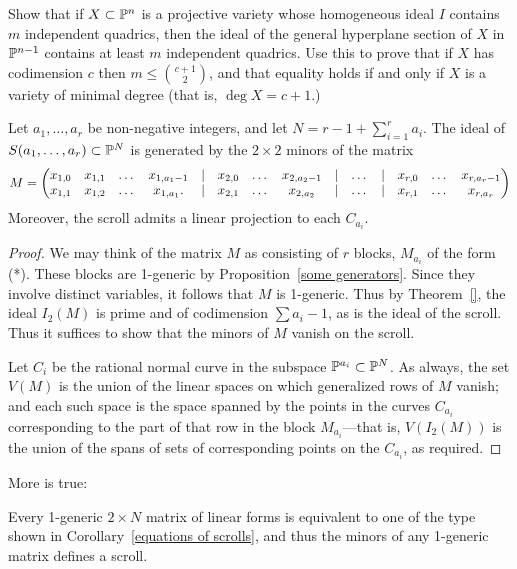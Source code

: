 \begin{exercise}
Show that if $X\subset {\mathbb P}^n$ is a projective variety whose homogeneous ideal $I$ contains $m$ independent quadrics, then the ideal of the general hyperplane section of $X$ in ${\mathbb P}^{n-1}$
contains at least $m$ independent quadrics. Use this to prove that if $X$ has codimension $c$ then $m\leq {c+1\choose 2}$, and that equality holds if and only if
$X$ is a variety of minimal degree (that is, $\deg X = c+1$.)
\end{exercise}

\begin{corollary}\label{equations of scrolls} Let $a_{1}, \dots, a_{r}$ be non-negative integers, and let $N = r-1+\sum_{i=1}^{r} a_{i}$.
The ideal of $S(a_{1},\dots,a_{r})\subset {\mathbb P}^{N}$ is generated by the $2\times 2$ minors of the matrix
{\footnotesize
$$
\setcounter{MaxMatrixCols}{20}
M = \begin{pmatrix}
x_{1,0}&x_{1,1}&\dots&x_{1, a_{1}-1}&|&x_{2,0}&\dots&x_{2, a_{2}-1}&|&\dots&|&x_{r,0}&\dots&x_{r, a_{r}-1}\\
x_{1,1}&x_{1,2}&\dots&x_{1, a_{1}}.  &|&x_{2,1}&\dots&x_{2, a_{2}}&|&\dots&|&x_{r,1}&\dots&x_{r, a_{r}}
\end{pmatrix}
$$
}
Moreover, the scroll admits a linear projection to each $C_{a_i}$.
\end{corollary}

\begin{proof} We may think of the matrix $M$ as consisting of $r$ blocks, $M_{a_{i}}$ of the form (*). These blocks are 1-generic by Proposition~\ref{some generators}. Since they involve distinct variables, it follows that $M$ is 1-generic. Thus by
Theorem~\ref{}, the ideal $I_{2}(M)$ is prime and of codimension $\sum a_{i}-1$, as is the ideal of the scroll. Thus it suffices to show that the minors of $M$ vanish on the scroll.

Let $C_{i}$ be the rational normal curve in the subspace ${\mathbb P}^{a_{i}}\subset{\mathbb P}^{N}$.
As always, the set $V(M)$ is the union of the linear spaces on which generalized rows of $M$ vanish; and each such space is the space spanned by the points in the curves $C_{a_{i}}$ corresponding to the part of that row in the block $M_{a_{i}}$---that is, $V(I_{2}(M))$ is the union of the spans of sets of corresponding points on the $C_{a_{i}}$, as required.
\end{proof}

More is true: 
\begin{fact}
 Every
 1-generic $2 \times N$ matrix of linear forms is equivalent to one of the type shown in
Corollary~\ref{equations of scrolls}, and thus the minors of any 1-generic matrix defines a scroll. 
\end{fact}

